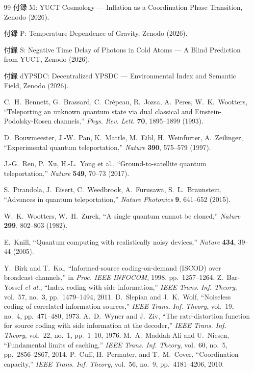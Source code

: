 \documentclass[12pt,a4paper]{article}
\theoremstyle{definition}
\theoremstyle{remark}
\begin{document}
\begin{thebibliography}{99}
		付録 M: YUCT Cosmology — Inflation as a Coordination Phase Transition, Zenodo (2026).
		
		付録 P: Temperature Dependence of Gravity, Zenodo (2026).
		
		付録 S: Negative Time Delay of Photons in Cold Atoms — A Blind Prediction from YUCT, Zenodo (2026).
		
		付録 dYPSDC: Decentralized YPSDC — Environmental Index and Semantic Field, Zenodo (2026).
		
		 C.~H.~Bennett, G.~Brassard, C.~Crépeau, R.~Jozsa, A.~Peres, W.~K.~Wootters,
		``Teleporting an unknown quantum state via dual classical and Einstein-Podolsky-Rosen channels,''
		\emph{Phys. Rev. Lett.} \textbf{70}, 1895--1899 (1993).
		
		 D.~Bouwmeester, J.-W.~Pan, K.~Mattle, M.~Eibl, H.~Weinfurter, A.~Zeilinger,
		``Experimental quantum teleportation,''
		\emph{Nature} \textbf{390}, 575--579 (1997).
		
		 J.-G.~Ren, P.~Xu, H.-L.~Yong et al.,
		``Ground-to-satellite quantum teleportation,''
		\emph{Nature} \textbf{549}, 70--73 (2017).
		
		 S.~Pirandola, J.~Eisert, C.~Weedbrook, A.~Furusawa, S.~L.~Braunstein,
		``Advances in quantum teleportation,''
		\emph{Nature Photonics} \textbf{9}, 641--652 (2015).
		
		 W.~K.~Wootters, W.~H.~Zurek,
		``A single quantum cannot be cloned,''
		\emph{Nature} \textbf{299}, 802--803 (1982).
		
		 E.~Knill,
		``Quantum computing with realistically noisy devices,''
		\emph{Nature} \textbf{434}, 39--44 (2005).
		
		 Y.~Birk and T.~Kol, ``Informed-source coding-on-demand (ISCOD) over broadcast channels,'' in \emph{Proc. IEEE INFOCOM}, 1998, pp.~1257--1264.
		 Z.~Bar-Yossef \emph{et al.}, ``Index coding with side information,'' \emph{IEEE Trans. Inf. Theory}, vol.~57, no.~3, pp.~1479--1494, 2011.
		 D.~Slepian and J.~K.~Wolf, ``Noiseless coding of correlated information sources,'' \emph{IEEE Trans. Inf. Theory}, vol.~19, no.~4, pp.~471--480, 1973.
		 A.~D.~Wyner and J.~Ziv, ``The rate-distortion function for source coding with side information at the decoder,'' \emph{IEEE Trans. Inf. Theory}, vol.~22, no.~1, pp.~1--10, 1976.
		 M.~A.~Maddah-Ali and U.~Niesen, ``Fundamental limits of caching,'' \emph{IEEE Trans. Inf. Theory}, vol.~60, no.~5, pp.~2856--2867, 2014.
		 P.~Cuff, H.~Permuter, and T.~M.~Cover, ``Coordination capacity,'' \emph{IEEE Trans. Inf. Theory}, vol.~56, no.~9, pp.~4181--4206, 2010.
		
	\end{thebibliography}
	
\end{document}
